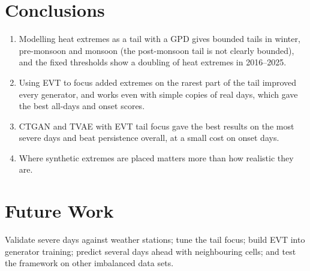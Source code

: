 \documentclass[12pt,a4paper]{report}
\begin{document}
\section{Conclusions}
\begin{enumerate}
  \item Modelling heat extremes as a tail with a GPD gives bounded tails in winter, pre-monsoon and monsoon (the
        post-monsoon tail is not clearly bounded), and the fixed thresholds show a doubling of heat extremes in
        2016--2025.
  \item Using EVT to focus added extremes on the rarest part of the tail improved every generator, and works even with
        simple copies of real days, which gave the best all-days and onset scores.
  \item CTGAN and TVAE with EVT tail focus gave the best results on the most severe days and beat persistence overall,
        at a small cost on onset days.
  \item Where synthetic extremes are placed matters more than how realistic they are.
\end{enumerate}

\section{Future Work}
Validate severe days against weather stations; tune the tail focus; build EVT into generator training; predict
several days ahead with neighbouring cells; and test the framework on other imbalanced data sets.
\end{document}
